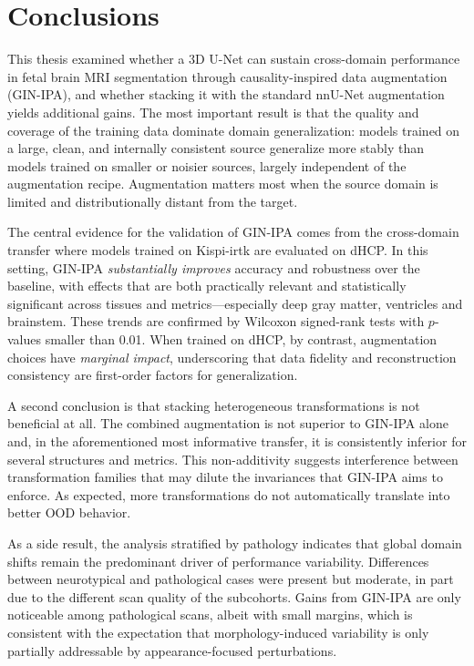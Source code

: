 
\chapter*{Conclusions}
\vspace{1cm}

This thesis examined whether a 3D U-Net can sustain cross-domain performance in fetal brain MRI segmentation through causality-inspired data augmentation (GIN-IPA), and whether stacking it with the standard nnU-Net augmentation yields additional gains. The most important result is that the quality and coverage of the training data dominate domain generalization: models trained on a large, clean, and internally consistent source generalize more stably than models trained on smaller or noisier sources, largely independent of the augmentation recipe. Augmentation matters most when the source domain is limited and distributionally distant from the target.

The central evidence for the validation of GIN-IPA comes from the cross-domain transfer where models trained on Kispi-irtk are evaluated on dHCP. In this setting, GIN-IPA \emph{substantially improves} accuracy and robustness over the baseline, with effects that are both practically relevant and statistically significant across tissues and metrics---especially deep gray matter, ventricles and brainstem. These trends are confirmed by Wilcoxon signed-rank tests with $p$-values smaller than \num{0.01}. When trained on dHCP, by contrast, augmentation choices have \emph{marginal impact}, underscoring that data fidelity and reconstruction consistency are first-order factors for generalization.

A second conclusion is that stacking heterogeneous transformations is not beneficial at all. The combined augmentation is not superior to GIN-IPA alone and, in the aforementioned most informative transfer, it is consistently inferior for several structures and metrics. This non-additivity suggests interference between transformation families that may dilute the invariances that GIN-IPA aims to enforce. As expected, more transformations do not automatically translate into better OOD behavior.

As a side result, the analysis stratified by pathology indicates that global domain shifts remain the predominant driver of performance variability. Differences between neurotypical and pathological cases were present but moderate, in part due to the different scan quality of the subcohorts. Gains from GIN-IPA are only noticeable among pathological scans, albeit with small margins, which is consistent with the expectation that morphology-induced variability is only partially addressable by appearance-focused perturbations.

